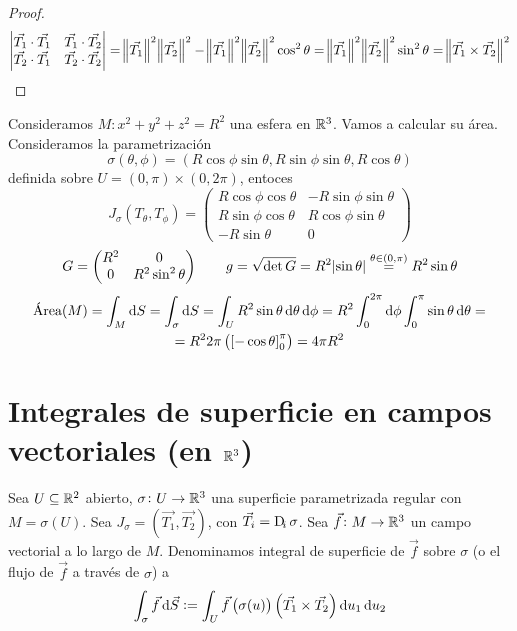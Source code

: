 \begin{proof}
    \[
        \begin{vmatrix}\vec{T_1}\cdot \vec{T_1} & \vec{T_1} \cdot \vec{T_2} \\ \vec{T_2}\cdot\vec{T_1} & \vec{T_2}\cdot\vec{T_2}\end{vmatrix} =
        \norm{\vec{T_1}}^2 \norm{\vec{T_2}}^2 - \norm{\vec{T_1}}^2\norm{\vec{T_2}}^2 \cos^2 \theta = \norm{\vec{T_1}}^2\norm{\vec{T_2}}^2 \sin^2 \theta
        = \norm{\vec{T_1} \times \vec{T_2}}^2
    \]
\end{proof}

\begin{example*}
    Consideramos $M: x^2 + y^2 + z^2 = R^2$ una esfera en $\mathbb{R}^3$. Vamos a calcular su área. Consideramos la parametrización
    \[
        \sigma(\theta, \phi) = \left( R \cos \phi \sin \theta, R \sin\phi \sin \theta, R \cos \theta \right)
    \]
    definida sobre $U = (0,\pi) \times (0,2\pi)$, entoces
    \[
        J_\sigma\left( T_\theta, T_\phi \right) =
        \begin{pmatrix}
            R \cos \phi \cos \theta & - R \sin\phi\sin\theta \\
            R \sin \phi \cos \theta & R \cos\phi\sin\theta \\
            -R\sin\theta & 0
        \end{pmatrix}
    \]
    \[
        G =
        \begin{pmatrix}
            R^2 & 0 \\ 0 & R^2 \sin^2\theta
        \end{pmatrix}
        \qquad
        g = \sqrt{\det G} = R^2 \abs{\sin \theta} \stackrel{\theta \in (0,\pi)}{=} R^2 \sin \theta
    \]
    \begin{gather*}
        \text{Área}(M) = \int_M \dif S = \int_\sigma \dif S = \int_U R^2 \sin \theta \dif \theta \dif \phi = R^2 \int^{2\pi}_0 \dif\phi \int^\pi_0 \sin \theta \dif \theta = \\
        = R^2 2\pi \left( \left[ -\cos\theta \right]^\pi_0 \right) = 4\pi R^2
    \end{gather*}
\end{example*}

\section{Integrales de superficie en campos vectoriales (en $\mathbb{R}^3$)}

\begin{defi}
    Sea $U \subseteq \mathbb{R}^2$ abierto, $\sigma \colon U \to \mathbb{R}^3$ una superficie parametrizada regular con
    $M = \sigma(U)$. Sea $J_\sigma = \left( \vec{T_1}, \vec{T_2} \right)$, con $\vec{T_i} = \Dif_i \sigma$.
    Sea $\vec{f} \colon M \to \mathbb{R}^3$ un campo vectorial a lo largo de $M$. Denominamos integral de superficie de $\vec{f}$
    sobre $\sigma$ (o el flujo de $\vec{f}$ a trav\'es de $\sigma$) a
    \[
        \int_\sigma \vec{f} \dif \vec{S} := \int_U \vec{f}\left( \sigma(u) \right) \left( \vec{T_1} \times \vec{T_2} \right) \dif u_1 \dif u_2
    \]
\end{defi}


